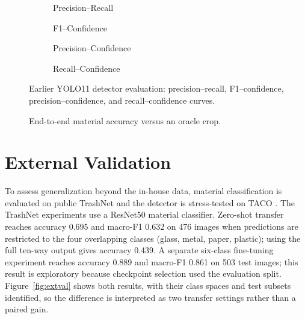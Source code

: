 \begin{figure}[!ht]
    \centering
    \begin{subfigure}{0.48\textwidth}\centering{}\caption{Precision--Recall}\end{subfigure}\hfill
    \begin{subfigure}{0.48\textwidth}\centering{}\caption{F1--Confidence}\end{subfigure}

    \vspace{0.7em}
    \begin{subfigure}{0.48\textwidth}\centering{}\caption{Precision--Confidence}\end{subfigure}\hfill
    \begin{subfigure}{0.48\textwidth}\centering{}\caption{Recall--Confidence}\end{subfigure}
    \caption{Earlier YOLO11 detector evaluation: precision--recall, F1--confidence, precision--confidence, and recall--confidence curves.}
    \label{fig:detcurves}
\end{figure}

\begin{figure}[!ht]
    \centering
    \caption{End-to-end material accuracy versus an oracle crop.}
    \label{fig:e2e}
\end{figure}

\section{External Validation}
To assess generalization beyond the in-house data, material classification is evaluated on public TrashNet \cite{trashnet} and the detector is stress-tested on TACO \cite{taco}. The TrashNet experiments use a ResNet50 material classifier. Zero-shot transfer reaches accuracy 0.695 and macro-F1 0.632 on 476 images when predictions are restricted to the four overlapping classes (glass, metal, paper, plastic); using the full ten-way output gives accuracy 0.439. A separate six-class fine-tuning experiment reaches accuracy 0.889 and macro-F1 0.861 on 503 test images; this result is exploratory because checkpoint selection used the evaluation split. Figure~\ref{fig:extval} shows both results, with their class spaces and test subsets identified, so the difference is interpreted as two transfer settings rather than a paired gain.

